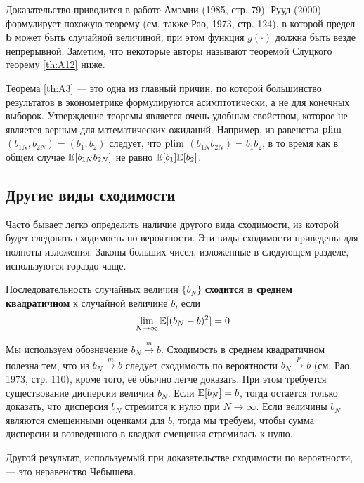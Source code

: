 Доказательство приводится в работе Амэмии (1985, стр. 79). Рууд (2000) формулирует похожую теорему (см. также Рао, 1973, стр. 124), в которой предел $\mathbf{b}$ может быть случайной величиной, при этом функция $g(\cdot)$ должна быть везде непрерывной. Заметим, что некоторые авторы называют теоремой Слуцкого теорему \ref{th:A12} ниже.

Теорема \ref{th:A3}  --- это одна из главный причин, по которой большинство результатов в эконометрике формулируются асимптотически, а не для конечных выборок. Утверждение теоремы является очень удобным свойством, которое не является верным для математических ожиданий. Например, из равенства $\mathrm{plim }$ $(b_{1N},b_{2N})=(b_1,b_2)$ следует, что $\mathrm{plim }$ $(b_{1N}b_{2N})=b_1b_2$, в то время как в общем случае $\mathbb{E}[b_{1N}b_{2N}]$ не равно $\mathbb{E}[b_{1}]\mathbb{E}[b_{2}]$.



\subsection{Другие виды сходимости}

Часто бывает легко определить наличие другого вида сходимости, из которой будет следовать сходимость по вероятности. Эти виды сходимости приведены для полноты изложения. Законы больших чисел, изложенные в следующем разделе, используются гораздо чаще.

\begin{definition} Последовательность случайных величин $\{b_N\}$  \textbf{сходится в среднем квадратичном} к случайной величине $b$, если 
\begin{equation}
\lim_{N\to\infty} \mathbb{E}[(b_N-b)^2] = 0
\end{equation}
\end{definition}

Мы используем обозначение $b_N \overset{m}{\to}b$. Сходимость в среднем квадратичном полезна тем, что из $b_N\overset{m}{\to} b$ следует сходимость по вероятности $b_N\overset{p}{\to}b$ (см. Рао, 1973, стр. 110), кроме того, её обычно легче доказать. При этом требуется существование дисперсии величин $b_N$. Если $\mathbb{E}[b_N]=b$, тогда остается только доказать, что дисперсия $b_N$ стремится к нулю при $N\to\infty$. Если величины $b_N$ являются смещенными оценками для $b$, тогда мы требуем, чтобы сумма дисперсии и возведенного в квадрат смещения стремилась к нулю.

Другой результат, используемый при доказательстве сходимости по вероятности, --- это неравенство Чебышева.

